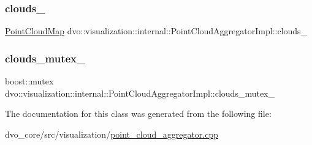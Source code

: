 \subsubsection{\texorpdfstring{clouds\+\_\+}{clouds\_}}
{\footnotesize\ttfamily \mbox{\hyperlink{namespacedvo_1_1visualization_a6bfc209b639de1fc1fb54582af7292f7}{Point\+Cloud\+Map}} dvo\+::visualization\+::internal\+::\+Point\+Cloud\+Aggregator\+Impl\+::clouds\+\_\+}

\mbox{\label{classdvo_1_1visualization_1_1internal_1_1_point_cloud_aggregator_impl_a1b959ce567fa43e695eab5c33b56ab4f}} 
\subsubsection{\texorpdfstring{clouds\+\_\+mutex\+\_\+}{clouds\_mutex\_}}
{\footnotesize\ttfamily boost\+::mutex dvo\+::visualization\+::internal\+::\+Point\+Cloud\+Aggregator\+Impl\+::clouds\+\_\+mutex\+\_\+}



The documentation for this class was generated from the following file\+:\begin{DoxyCompactItemize}
\item 
dvo\+\_\+core/src/visualization/\mbox{\hyperlink{point__cloud__aggregator_8cpp}{point\+\_\+cloud\+\_\+aggregator.\+cpp}}\end{DoxyCompactItemize}
